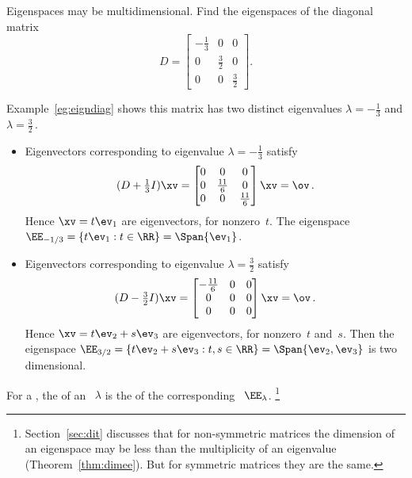 \begin{example} \label{eg:espace2d}
Eigenspaces may be multidimensional.  
Find the eigenspaces of the diagonal matrix
\begin{equation*}
D=\begin{bmatrix} -\frac13&0&0\\0&\frac32&0\\0&0&\frac32 \end{bmatrix}.
\end{equation*}
\begin{solution} 
Example~\ref{eg:eigndiag} shows this matrix has two distinct eigenvalues \(\lambda=-\frac13\) and \(\lambda=\frac32\)\,.
\begin{itemize}
\item Eigenvectors corresponding to eigenvalue \(\lambda=-\frac13\) satisfy
\begin{equation*}
(D+\tfrac13I)\xv=\begin{bmatrix} 0&0&0\\0&\frac{11}6&0\\0&0&\frac{11}6 \end{bmatrix}\xv=\ov\,.
\end{equation*}
Hence \(\xv=t\ev_1\) are eigenvectors, for nonzero~\(t\).
The eigenspace \(\EE_{-1/3}=\{t\ev_1 : t\in\RR\}=\Span\{\ev_1\}\).

\item Eigenvectors corresponding to eigenvalue \(\lambda=\frac32\) satisfy
\begin{equation*}
(D-\tfrac32I)\xv=\begin{bmatrix} -\frac{11}6&0&0\\0&0&0\\0&0&0 \end{bmatrix}\xv=\ov\,.
\end{equation*}
Hence \(\xv=t\ev_2+s\ev_3\) are eigenvectors, for nonzero~\(t\) and~\(s\).
Then the eigenspace \(\EE_{3/2}=\{t\ev_2+s\ev_3 : t,s\in\RR\}=\Span\{\ev_2,\ev_3\}\) is two dimensional.

\end{itemize}
\end{solution}
\end{example}




\begin{definition} \label{def:eigsymult}
For a , the  of an ~\(\lambda\) is the  of the corresponding ~\(\EE_\lambda\).%
\footnote{Section~\ref{sec:dit} discusses that for non-symmetric matrices the dimension of an eigenspace may be less than the multiplicity of an eigenvalue (Theorem~\ref{thm:dimee}). 
But for symmetric matrices they are the same.}
\end{definition}



